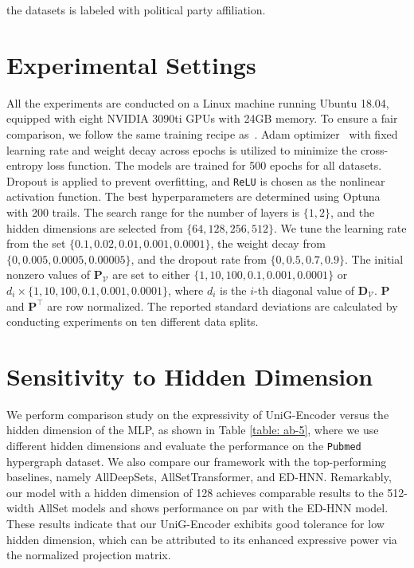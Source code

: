 \documentclass[review]{elsarticle}
\begin{document}
the datasets is labeled with political party affiliation.

\section{Experimental Settings}

All the experiments are conducted on a Linux machine running Ubuntu 18.04, equipped with eight NVIDIA 3090ti GPUs with 24GB memory. To ensure a fair comparison, we follow the same training recipe as~\cite{wang2022equivariant,chien2021you}. Adam optimizer~\cite{kingma2014adam} with fixed learning rate and weight decay across epochs is utilized to minimize the cross-entropy loss function. The models are trained for 500 epochs for all datasets. Dropout is applied to prevent overfitting, and \texttt{ReLU} is chosen as the nonlinear activation function. The best hyperparameters are determined using Optuna~\cite{akiba2019optuna} with 200 trails. The search range for the number of layers is $\{1,2\}$, and the hidden dimensions are selected from $\{64,128,256,512\}$. We tune the learning rate from the set $\{0.1,0.02,0.01,0.001,0.0001\}$, the weight decay from $\{0,0.005,0.0005,0.00005\}$, and the dropout rate from $\{0,0.5,0.7,0.9\}$. The initial nonzero values of $\mathbf{P}_\mathcal{V}$ are set to either $\{1,10,100,0.1,0.001,0.0001\}$ or $d_i\times\{1,10,100,0.1,0.001,0.0001\}$, where $d_i$ is the $i$-th diagonal value of $\mathbf{D}_\mathcal{V}$. $\mathbf{P}$ and $\mathbf{P}^\top$ are row normalized. The reported standard deviations are calculated by conducting experiments on ten different data splits.

\section{Sensitivity to Hidden Dimension}

We perform comparison study on the expressivity of UniG-Encoder versus the hidden dimension of the MLP, as shown in Table \ref{table: ab-5}, where we use different hidden dimensions and evaluate the performance on the \texttt{Pubmed} hypergraph dataset. We also compare our framework with the top-performing baselines, namely AllDeepSets, AllSetTransformer, and ED-HNN. Remarkably, our model with a hidden dimension of 128 achieves comparable results to the 512-width AllSet models and shows performance on par with the ED-HNN model. These results indicate that our UniG-Encoder exhibits good tolerance for low hidden dimension, which can be attributed to its enhanced expressive power via the normalized projection matrix.
\end{document}
